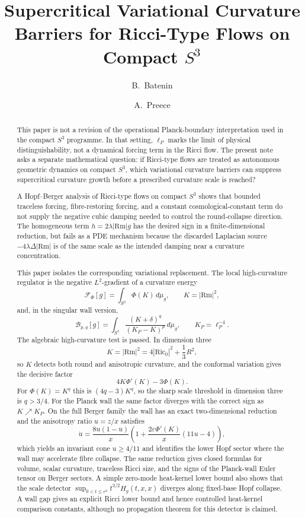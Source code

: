 \documentclass[11pt]{amsart}
\title[Supercritical Variational Curvature Barriers]{Supercritical Variational Curvature Barriers for Ricci-Type Flows on Compact \(S^3\)}
\author{B.~Batenin}
\author{A.~Preece}
\date{}
\newcommand{\Rm}{\mathrm{Rm}}
\newcommand{\Ric}{\mathrm{Ric}}
\newcommand{\KP}{K_{\!P}}
\newcommand{\F}{\mathcal F}
\newcommand{\B}{\mathcal B}
\begin{document}
\raggedbottom

\begin{abstract}

This paper is not a revision of the operational Planck-boundary interpretation
used in the compact \(S^3\) programme.  In that setting, \(\ell_P\) marks the
limit of physical distinguishability, not a dynamical forcing term in the Ricci
flow.  The present note asks a separate mathematical question: if Ricci-type
flows are treated as autonomous geometric dynamics on compact \(S^3\), which
variational curvature barriers can suppress supercritical curvature growth
before a prescribed curvature scale is reached?

A Hopf--Berger analysis of Ricci-type flows on compact \(S^3\)
shows that bounded traceless forcing, fibre-restoring forcing, and a constant
cosmological-constant term do not supply the negative cubic damping needed to
control the round-collapse direction.  The homogeneous term
\(h=2\lambda |\Rm|g\) has the desired sign in a finite-dimensional reduction,
but fails as a PDE mechanism because the discarded Laplacian source
\(-4\lambda \Delta |\Rm|\) is of the same scale as the intended damping near a
curvature concentration.

This paper isolates the corresponding variational replacement.  The local
high-curvature regulator is the negative \(L^2\)-gradient of a curvature
energy
\[
        \F_\Phi[g]=\int_{S^3}\Phi(K)\,d\mu_g,\qquad K=|\Rm|^2,
\]
and, in the singular wall version,
\[
        \B_{p,q}[g]
        =
        \int_{S^3}
        \frac{(K+\delta)^q}{(\KP-K)^p}\,d\mu_g,
        \qquad
        \KP=\ell_P^{-4}.
\]
The algebraic high-curvature test is passed.  In dimension three
\[
        K=|\Rm|^2=4|\Ric_0|^2+\frac13R^2,
\]
so \(K\) detects both round and anisotropic curvature, and the conformal
variation gives the decisive factor
\[
        4K\Phi'(K)-3\Phi(K).
\]
For \(\Phi(K)=K^q\) this is \((4q-3)K^q\), so the sharp scale threshold in
dimension three is \(q>3/4\).  For the Planck wall the same factor diverges
with the correct sign as \(K\nearrow\KP\).  On the full Berger family the wall
has an exact two-dimensional reduction and the anisotropy ratio \(u=z/x\)
satisfies
\[
        \dot u
        =
        \frac{8u(1-u)}{x}
        \left(1+\frac{2\varepsilon\Phi'(K)}{x}(11u-4)\right),
\]
which yields an invariant cone \(u\ge4/11\) and identifies the lower Hopf
sector where the wall may accelerate fibre collapse.  The same reduction gives
closed formulas for volume, scalar curvature, traceless Ricci size, and the
signs of the Planck-wall Euler tensor on Berger sectors.  A simple zero-mode
heat-kernel lower bound also shows that the scale detector
\(\sup_{0<t\le r^2}t^{3/2}H_g(t,x,x)\) diverges along fixed-base Hopf
collapse.  A wall gap gives an explicit Ricci lower bound and hence controlled
heat-kernel comparison constants, although no propagation theorem for this
detector is claimed.


\end{abstract}
\end{document}
